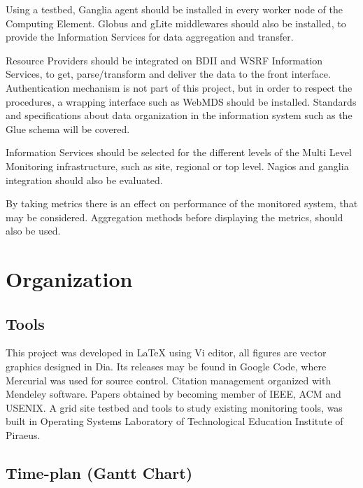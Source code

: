 Using a testbed, Ganglia agent should be installed in every worker node of the Computing Element. Globus and gLite middlewares should also be installed, to provide the Information Services for data aggregation and transfer.

Resource Providers should be integrated on \ac{BDII} and \ac{WSRF} Information Services, to get, parse/transform and deliver the data to the front interface. Authentication mechanism is not part of this project, but in order to respect the procedures, a wrapping interface such as WebMDS should be installed. Standards and specifications about data organization in the information system such as the Glue schema will be covered.

Information Services should be selected for the different levels of the Multi Level Monitoring infrastructure, such as site, regional or top level. Nagios and ganglia integration should also be evaluated.

By taking metrics there is an effect on performance of the monitored system, that may be considered. Aggregation methods before displaying the metrics, should also be used.

\section{Organization}

\subsection[Tools]{Tools}
This project was developed in \LaTeX{} using Vi editor, all figures are vector graphics designed in Dia. Its releases may be found in Google Code, where Mercurial was used for source control. Citation management organized with Mendeley software. Papers obtained by becoming member of IEEE, ACM and USENIX. A grid site testbed and tools to study existing monitoring tools, was built in Operating Systems Laboratory of Technological Education Institute of Piraeus.

\subsection[Time plan]{Time-plan (Gantt Chart)}

